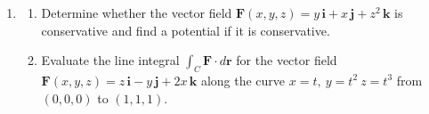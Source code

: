 \documentclass[a4paper, 12pt]{article}
\renewcommand{\headrulewidth}{0pt}
\begin{document}
\begin{enumerate}[leftmargin=*,label=\textbf{\arabic*.}]
\item \begin{enumerate}[leftmargin=*,label=\textbf{\alph*.}]
\item Determine whether the vector field $\mathbf{F}(x,y,z)=y\,\mathbf{i}+x\,\mathbf{j}+z^2\,\mathbf{k}$ is conservative and find a potential if it is conservative.

\item Evaluate the line integral $\int_C\mathbf{F}\cdot d\mathbf{r}$ for the vector field $\mathbf{F}(x,y,z)=z\,\mathbf{i}-y\,\mathbf{j}+2x\,\mathbf{k}$ along the curve $x=t,\:y=t^2\:z=t^3$ from $(0,0,0)$ to $(1,1,1)$.
\end{enumerate}
\end{enumerate}

\newpage
\pagestyle{fancy}
\renewcommand{\headrulewidth}{1pt}

\end{document}
